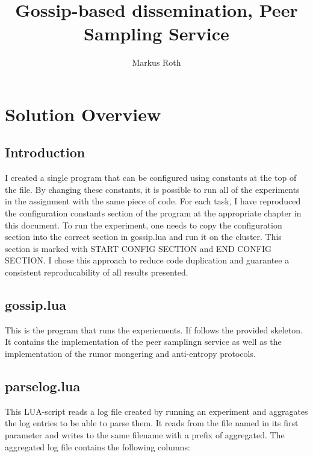\documentclass[a4paper]{article}
\title{Gossip-based dissemination, Peer Sampling Service}
\author{Markus Roth}
\begin{document}
\maketitle

\tableofcontents

\section{Solution Overview}

\subsection{Introduction}

I created a single program that can be configured using constants at the top of the file. By changing these constants, it is possible to run all of the experiments in the assignment with the same piece of code. For each task, I have reproduced the configuration constants section of the program at the appropriate chapter in this document. To run the experiment, one needs to copy the configuration section into the correct section in gossip.lua and run it on the cluster. This section is marked with START CONFIG SECTION and END CONFIG SECTION.
I chose this approach to reduce code duplication and guarantee a consistent reproducability of all results presented.

\subsection{gossip.lua}

This is the program that runs the experiements. If follows the provided skeleton. It contains the implementation of the peer samplingn service as well as the implementation of the rumor mongering and anti-entropy protocols.

\subsection{parselog.lua}

This LUA-script reads a log file created by running an experiment and aggragates the log entries to be able to parse them. It reads from the file named in its first parameter and writes to the same filename with a prefix of aggregated\textunderscore . The aggregated log file contains the following columns:
\end{document}
